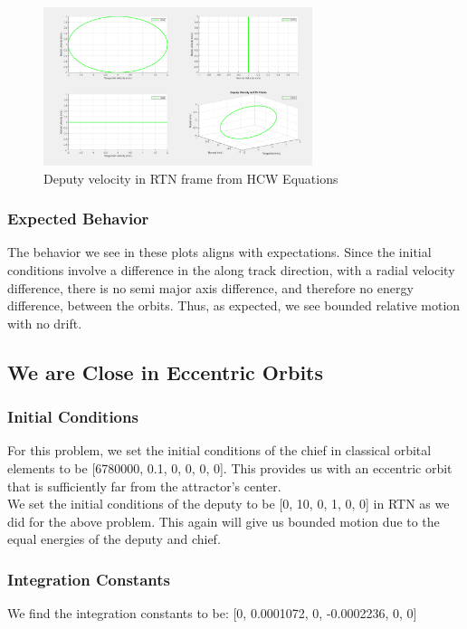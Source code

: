 \begin{figure}[H]
    \centering
    \includegraphics[width=0.7\textwidth]{PS3/Figures/HCW_Velocity.png}
    \caption{Deputy velocity in RTN frame from HCW Equations}
    \label{fig:hcw_velocity}
\end{figure}

\subsubsection{Expected Behavior}

The behavior we see in these plots aligns with expectations. Since the initial conditions involve a difference in the along track direction, with a radial velocity difference, there is no semi major axis difference, and therefore no energy difference, between the orbits. Thus, as expected, we see bounded relative motion with no drift.

\subsection{We are Close in Eccentric Orbits}

\subsubsection{Initial Conditions}
For this problem, we set the initial conditions of the chief in classical orbital elements to be [6780000, 0.1, 0, 0, 0, 0]. This provides us with an eccentric orbit that is sufficiently far from the attractor's center.\\

We set the initial conditions of the deputy to be [0, 10, 0, 1, 0, 0] in RTN as we did for the above problem. This again will give us bounded motion due to the equal energies of the deputy and chief.

\subsubsection{Integration Constants}
We find the integration constants to be: [0, 0.0001072, 0, -0.0002236, 0, 0]

